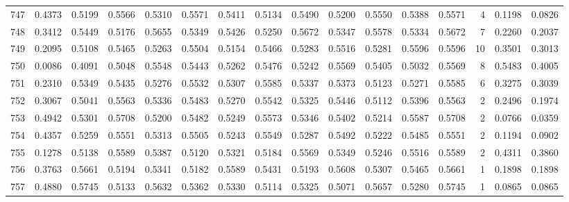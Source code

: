 \begin{tabular}{lrrrrrrrrrrrrrrr}
747 &      0.4373 &  0.5199 &  0.5566 &  0.5310 &  0.5571 &  0.5411 &  0.5134 &  0.5490 &  0.5200 &  0.5550 &   0.5388 &     0.5571 &      4 &                    0.1198 &                     0.0826 \\
748 &      0.3412 &  0.5449 &  0.5176 &  0.5655 &  0.5349 &  0.5426 &  0.5250 &  0.5672 &  0.5347 &  0.5578 &   0.5334 &     0.5672 &      7 &                    0.2260 &                     0.2037 \\
749 &      0.2095 &  0.5108 &  0.5465 &  0.5263 &  0.5504 &  0.5154 &  0.5466 &  0.5283 &  0.5516 &  0.5281 &   0.5596 &     0.5596 &     10 &                    0.3501 &                     0.3013 \\
750 &      0.0086 &  0.4091 &  0.5048 &  0.5548 &  0.5443 &  0.5262 &  0.5476 &  0.5242 &  0.5569 &  0.5405 &   0.5032 &     0.5569 &      8 &                    0.5483 &                     0.4005 \\
751 &      0.2310 &  0.5349 &  0.5435 &  0.5276 &  0.5532 &  0.5307 &  0.5585 &  0.5337 &  0.5373 &  0.5123 &   0.5271 &     0.5585 &      6 &                    0.3275 &                     0.3039 \\
752 &      0.3067 &  0.5041 &  0.5563 &  0.5336 &  0.5483 &  0.5270 &  0.5542 &  0.5325 &  0.5446 &  0.5112 &   0.5396 &     0.5563 &      2 &                    0.2496 &                     0.1974 \\
753 &      0.4942 &  0.5301 &  0.5708 &  0.5200 &  0.5482 &  0.5249 &  0.5573 &  0.5346 &  0.5402 &  0.5214 &   0.5587 &     0.5708 &      2 &                    0.0766 &                     0.0359 \\
754 &      0.4357 &  0.5259 &  0.5551 &  0.5313 &  0.5505 &  0.5243 &  0.5549 &  0.5287 &  0.5492 &  0.5222 &   0.5485 &     0.5551 &      2 &                    0.1194 &                     0.0902 \\
755 &      0.1278 &  0.5138 &  0.5589 &  0.5387 &  0.5120 &  0.5321 &  0.5184 &  0.5569 &  0.5349 &  0.5246 &   0.5516 &     0.5589 &      2 &                    0.4311 &                     0.3860 \\
756 &      0.3763 &  0.5661 &  0.5194 &  0.5341 &  0.5182 &  0.5589 &  0.5431 &  0.5193 &  0.5608 &  0.5307 &   0.5465 &     0.5661 &      1 &                    0.1898 &                     0.1898 \\
757 &      0.4880 &  0.5745 &  0.5133 &  0.5632 &  0.5362 &  0.5330 &  0.5114 &  0.5325 &  0.5071 &  0.5657 &   0.5280 &     0.5745 &      1 &                    0.0865 &                     0.0865 \\

\end{tabular}
